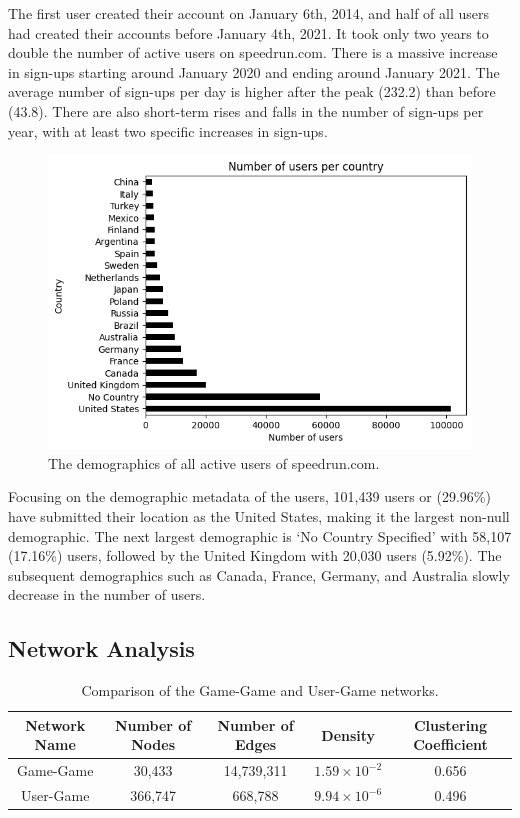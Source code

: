 The first user created their account on January 6th, 2014, and half of all users had created their accounts before January 4th, 2021. It took only two years to double the number of active users on speedrun.com. There is a massive increase in sign-ups starting around January 2020 and ending around January 2021. The average number of sign-ups per day is higher after the peak (232.2) than before (43.8). There are also short-term rises and falls in the number of sign-ups per year, with at least two specific increases in sign-ups.

\begin{figure}
    \centering
    \includegraphics[width=0.5\linewidth]{images/user_demographics.png}
    \caption{The demographics of all active users of speedrun.com.}
    \label{fig:my_label}
\end{figure}

Focusing on the demographic metadata of the users, 101,439 users or (29.96\%) have submitted their location as the United States, making it the largest non-null demographic. The next largest demographic is `No Country Specified' with 58,107 (17.16\%) users, followed by the United Kingdom with 20,030 users (5.92\%). The subsequent demographics such as Canada, France, Germany, and Australia slowly decrease in the number of users.

\subsection{Network Analysis}

\renewcommand{\arraystretch}{1.2}
\begin{table}[h]
    \centering
    \begin{tabular}{|*{5}{C|}}
        \hline
        \textbf{Network Name} & \textbf{Number of Nodes} & \textbf{Number of Edges} & \textbf{Density} & \textbf{Clustering Coefficient} \\ \hline
        Game-Game & 30,433 & 14,739,311 & $1.59 \times 10^{-2}$ & 0.656 \\ \hline
        User-Game & 366,747 & 668,788 & $9.94 \times 10^{-6}$ & 0.496 \\ \hline
    \end{tabular}
    \caption{Comparison of the Game-Game and User-Game networks.}
    \label{tab:networks}
\end{table}

